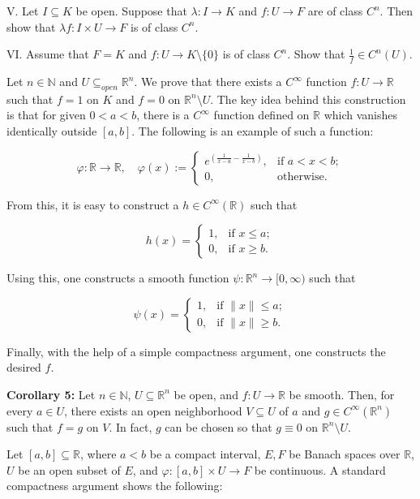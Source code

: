 \documentclass{book}
\begin{document}
V. Let $I \subseteq K$ be open. Suppose that $\lambda : I \to K$ and $f : U \to F$ are of class $C^n$. Then show that $\lambda f : I \times U \to F$ is of class $C^n$.

VI. Assume that $F = K$ and $f : U \to K \setminus \{0\}$ is of class $C^n$. Show that $\frac{1}{f} \in C^n(U)$.

Let $n \in \mathbb{N}$ and $U \subseteq_{open} \mathbb{R}^n$. We prove that there exists a $C^{\infty}$ function $f : U \to \mathbb{R}$ such that $f = 1$ on $K$ and $f = 0$ on $\mathbb{R}^n \setminus U$. The key idea behind this construction is that for given $0 < a < b$, there is a $C^{\infty}$ function defined on $\mathbb{R}$ which vanishes identically outside $[a, b]$. The following is an example of such a function:

\[
\varphi : \mathbb{R} \to \mathbb{R}, \quad \varphi(x) :=
\begin{cases}
e^{\left( \frac{1}{x-a} - \frac{1}{x-b} \right)}, & \text{if } a < x < b; \\
0, & \text{otherwise.}
\end{cases}
\]

From this, it is easy to construct a $h \in C^{\infty}(\mathbb{R})$ such that

\[
h(x) =
\begin{cases}
1, & \text{if } x \leq a; \\
0, & \text{if } x \geq b.
\end{cases}
\]

Using this, one constructs a smooth function $\psi : \mathbb{R}^n \to [0, \infty)$ such that

\[
\psi(x) =
\begin{cases}
1, & \text{if } \|x\| \leq a; \\
0, & \text{if } \|x\| \geq b.
\end{cases}
\]

Finally, with the help of a simple compactness argument, one constructs the desired $f$.


\textbf{Corollary 5:} Let $n \in \mathbb{N}$, $U \subseteq \mathbb{R}^n$ be open, and $f : U \to \mathbb{R}$ be smooth. Then, for every $a \in U$, there exists an open neighborhood $V \subseteq U$ of $a$ and $g \in C^{\infty}(\mathbb{R}^n)$ such that $f = g$ on $V$. In fact, $g$ can be chosen so that $g \equiv 0$ on $\mathbb{R}^n \setminus U$.

Let $[a, b] \subseteq \mathbb{R}$, where $a < b$ be a compact interval, $E, F$ be Banach spaces over $\mathbb{R}$, $U$ be an open subset of $E$, and $\varphi : [a, b] \times U \to F$ be continuous. A standard compactness argument shows the following:
\end{document}
